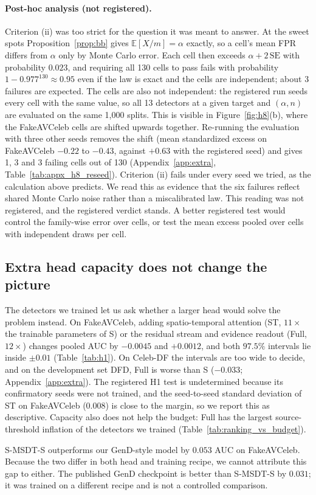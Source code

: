 \paragraph{Post-hoc analysis (not registered).}
Criterion (ii) was too strict for the question it was meant to answer. At the sweet spots Proposition~\ref{prop:bb} gives $\mathbb{E}[X/m]=\alpha$ exactly, so a cell's mean FPR differs from $\alpha$ only by Monte Carlo error. Each cell then exceeds $\alpha+2\,\mathrm{SE}$ with probability $0.023$, and requiring all 130 cells to pass fails with probability $1-0.977^{130}\approx0.95$ even if the law is exact and the cells are independent; about $3$ failures are expected. The cells are also not independent: the registered run seeds every cell with the same value, so all 13 detectors at a given target and $(\alpha,n)$ are evaluated on the same 1{,}000 splits. This is visible in Figure~\ref{fig:h8}(b), where the FakeAVCeleb cells are shifted upwards together. Re-running the evaluation with three other seeds removes the shift (mean standardized excess on FakeAVCeleb $-0.22$ to $-0.43$, against $+0.63$ with the registered seed) and gives 1, 3 and 3 failing cells out of 130 (Appendix~\ref{app:extra}, Table~\ref{tab:appx_h8_reseed}). Criterion (ii) fails under every seed we tried, as the calculation above predicts. We read this as evidence that the six failures reflect shared Monte Carlo noise rather than a miscalibrated law. This reading was not registered, and the registered verdict stands. A better registered test would control the family-wise error over cells, or test the mean excess pooled over cells with independent draws per cell.

\subsection{Extra head capacity does not change the picture}
\label{sec:res_capacity}



The detectors we trained let us ask whether a larger head would solve the problem instead. On FakeAVCeleb, adding spatio-temporal attention (ST, $11\times$ the trainable parameters of S) or the residual stream and evidence readout (Full, $12\times$) changes pooled AUC by $-0.0045$ and $+0.0012$, and both $97.5\%$ intervals lie inside $\pm0.01$ (Table~\ref{tab:h1}). On Celeb-DF the intervals are too wide to decide, and on the development set DFD, Full is worse than S ($-0.033$; Appendix~\ref{app:extra}). The registered H1 test is undetermined because its confirmatory seeds were not trained, and the seed-to-seed standard deviation of ST on FakeAVCeleb ($0.008$) is close to the margin, so we report this as descriptive. Capacity also does not help the budget: Full has the largest source-threshold inflation of the detectors we trained (Table~\ref{tab:ranking_vs_budget}).

S-MSDT-S outperforms our GenD-style model by $0.053$ AUC on FakeAVCeleb. Because the two differ in both head and training recipe, we cannot attribute this gap to either. The published GenD checkpoint is better than S-MSDT-S by $0.031$; it was trained on a different recipe and is not a controlled comparison.
